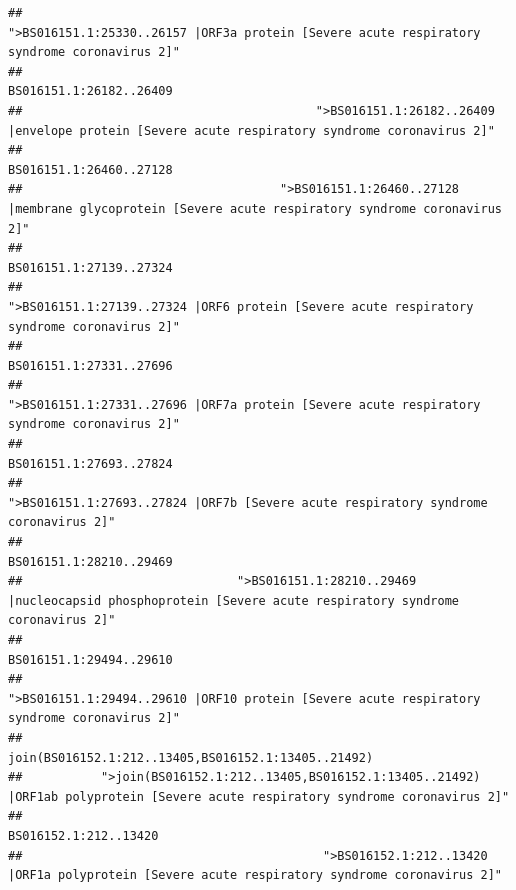 \documentclass[
]{article}
\begin{document}
\begin{verbatim}
##                                            ">BS016151.1:25330..26157 |ORF3a protein [Severe acute respiratory syndrome coronavirus 2]" 
##                                                                                                                BS016151.1:26182..26409 
##                                         ">BS016151.1:26182..26409 |envelope protein [Severe acute respiratory syndrome coronavirus 2]" 
##                                                                                                                BS016151.1:26460..27128 
##                                    ">BS016151.1:26460..27128 |membrane glycoprotein [Severe acute respiratory syndrome coronavirus 2]" 
##                                                                                                                BS016151.1:27139..27324 
##                                             ">BS016151.1:27139..27324 |ORF6 protein [Severe acute respiratory syndrome coronavirus 2]" 
##                                                                                                                BS016151.1:27331..27696 
##                                            ">BS016151.1:27331..27696 |ORF7a protein [Severe acute respiratory syndrome coronavirus 2]" 
##                                                                                                                BS016151.1:27693..27824 
##                                                    ">BS016151.1:27693..27824 |ORF7b [Severe acute respiratory syndrome coronavirus 2]" 
##                                                                                                                BS016151.1:28210..29469 
##                              ">BS016151.1:28210..29469 |nucleocapsid phosphoprotein [Severe acute respiratory syndrome coronavirus 2]" 
##                                                                                                                BS016151.1:29494..29610 
##                                            ">BS016151.1:29494..29610 |ORF10 protein [Severe acute respiratory syndrome coronavirus 2]" 
##                                                                                    join(BS016152.1:212..13405,BS016152.1:13405..21492) 
##           ">join(BS016152.1:212..13405,BS016152.1:13405..21492) |ORF1ab polyprotein [Severe acute respiratory syndrome coronavirus 2]" 
##                                                                                                                  BS016152.1:212..13420 
##                                          ">BS016152.1:212..13420 |ORF1a polyprotein [Severe acute respiratory syndrome coronavirus 2]" 

\end{verbatim}
\end{document}
